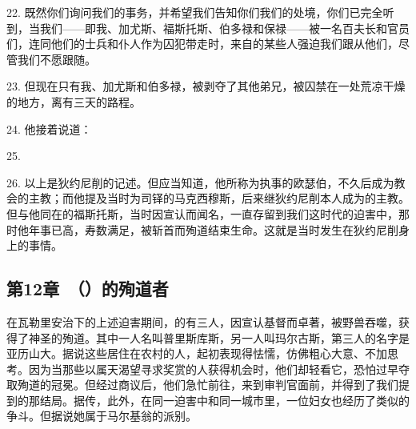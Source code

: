 22. 既然你们询问我们的事务，并希望我们告知你们我们的处境，你们已完全听到，当我们——即我、加尤斯、福斯托斯、伯多禄和保禄——被一名百夫长和官员们，连同他们的士兵和仆人作为囚犯带走时，来自的某些人强迫我们跟从他们，尽管我们不愿跟随。\par

23. 但现在只有我、加尤斯和伯多禄，被剥夺了其他弟兄，被囚禁在一处荒凉干燥的地方，离有三天的路程。\par

24. 他接着说道：\par

25. \par

26. 以上是狄约尼削的记述。但应当知道，他所称为执事的欧瑟伯，不久后成为教会的主教；而他提及当时为司铎的马克西穆斯，后来继狄约尼削本人成为的主教。但与他同在的福斯托斯，当时因宣认而闻名，一直存留到我们这时代的迫害中，那时他年事已高，寿数满足，被斩首而殉道结束生命。这就是当时发生在狄约尼削身上的事情。\par


\subsection{第12章　（）的殉道者}

在瓦勒里安治下的上述迫害期间，的有三人，因宣认基督而卓著，被野兽吞噬，获得了神圣的殉道。其中一人名叫普里斯库斯，另一人叫玛尔古斯，第三人的名字是亚历山大。据说这些居住在农村的人，起初表现得怯懦，仿佛粗心大意、不加思考。因为当那些以属天渴望寻求奖赏的人获得机会时，他们却轻看它，恐怕过早夺取殉道的冠冕。但经过商议后，他们急忙前往，来到审判官面前，并得到了我们提到的那结局。据传，此外，在同一迫害中和同一城市里，一位妇女也经历了类似的争斗。但据说她属于马尔基翁的派别。\par


